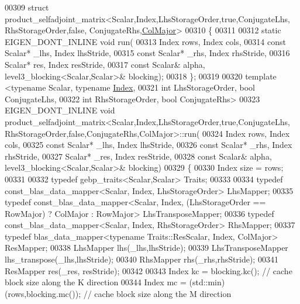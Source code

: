 \begin{DoxyCode}
00309 \textcolor{keyword}{struct }product\_selfadjoint\_matrix<Scalar,Index,LhsStorageOrder,true,ConjugateLhs, RhsStorageOrder,false,
      ConjugateRhs,\hyperlink{group__enums_ggaacded1a18ae58b0f554751f6cdf9eb13a0cbd4bdd0abcfc0224c5fcb5e4f6669a}{ColMajor}>
00310 \{
00311 
00312   \textcolor{keyword}{static} EIGEN\_DONT\_INLINE \textcolor{keywordtype}{void} run(
00313     Index rows, Index cols,
00314     \textcolor{keyword}{const} Scalar* \_lhs, Index lhsStride,
00315     \textcolor{keyword}{const} Scalar* \_rhs, Index rhsStride,
00316     Scalar* res,        Index resStride,
00317     \textcolor{keyword}{const} Scalar& alpha, level3\_blocking<Scalar,Scalar>& blocking);
00318 \};
00319 
00320 \textcolor{keyword}{template} <\textcolor{keyword}{typename} Scalar, \textcolor{keyword}{typename} \hyperlink{namespace_eigen_a62e77e0933482dafde8fe197d9a2cfde}{Index},
00321           \textcolor{keywordtype}{int} LhsStorageOrder, \textcolor{keywordtype}{bool} ConjugateLhs,
00322           \textcolor{keywordtype}{int} RhsStorageOrder, \textcolor{keywordtype}{bool} ConjugateRhs>
00323 EIGEN\_DONT\_INLINE \textcolor{keywordtype}{void} product\_selfadjoint\_matrix<Scalar,Index,LhsStorageOrder,true,ConjugateLhs,
       RhsStorageOrder,false,ConjugateRhs,ColMajor>::run(
00324     Index rows, Index cols,
00325     \textcolor{keyword}{const} Scalar* \_lhs, Index lhsStride,
00326     \textcolor{keyword}{const} Scalar* \_rhs, Index rhsStride,
00327     Scalar* \_res,        Index resStride,
00328     \textcolor{keyword}{const} Scalar& alpha, level3\_blocking<Scalar,Scalar>& blocking)
00329   \{
00330     Index size = rows;
00331 
00332     \textcolor{keyword}{typedef} gebp\_traits<Scalar,Scalar> Traits;
00333 
00334     \textcolor{keyword}{typedef} const\_blas\_data\_mapper<Scalar, Index, LhsStorageOrder> LhsMapper;
00335     \textcolor{keyword}{typedef} const\_blas\_data\_mapper<Scalar, Index, (LhsStorageOrder == RowMajor) ? ColMajor : RowMajor> 
      LhsTransposeMapper;
00336     \textcolor{keyword}{typedef} const\_blas\_data\_mapper<Scalar, Index, RhsStorageOrder> RhsMapper;
00337     \textcolor{keyword}{typedef} blas\_data\_mapper<typename Traits::ResScalar, Index, ColMajor> ResMapper;
00338     LhsMapper lhs(\_lhs,lhsStride);
00339     LhsTransposeMapper lhs\_transpose(\_lhs,lhsStride);
00340     RhsMapper rhs(\_rhs,rhsStride);
00341     ResMapper res(\_res, resStride);
00342 
00343     Index kc = blocking.kc();                   \textcolor{comment}{// cache block size along the K direction}
00344     Index mc = (std::min)(rows,blocking.mc());  \textcolor{comment}{// cache block size along the M direction}

\end{DoxyCode}
